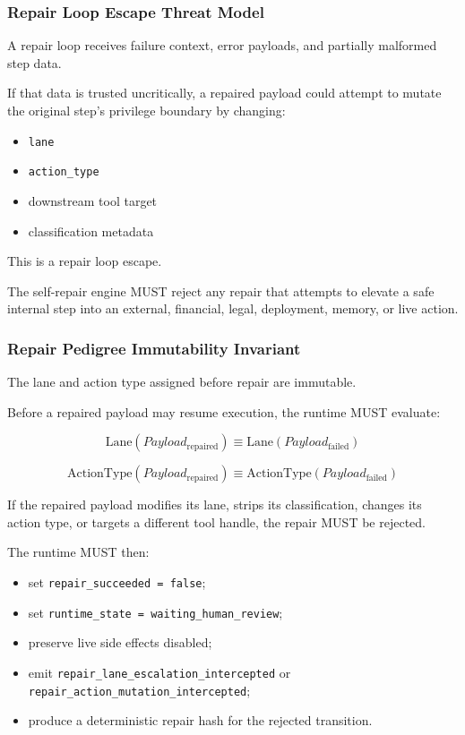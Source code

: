 \subsubsection{Repair Loop Escape Threat Model}

A repair loop receives failure context, error payloads, and partially malformed step data.

If that data is trusted uncritically, a repaired payload could attempt to mutate the original step's privilege boundary by changing:

\begin{itemize}
  \item \texttt{lane}
  \item \texttt{action\_type}
  \item downstream tool target
  \item classification metadata
\end{itemize}

This is a repair loop escape.

The self-repair engine MUST reject any repair that attempts to elevate a safe internal step into an external, financial, legal, deployment, memory, or live action.

\subsubsection{Repair Pedigree Immutability Invariant}

The lane and action type assigned before repair are immutable.

Before a repaired payload may resume execution, the runtime MUST evaluate:

\begin{equation}
\mathrm{Lane}(Payload_{\mathrm{repaired}})
\equiv
\mathrm{Lane}(Payload_{\mathrm{failed}})
\end{equation}

\begin{equation}
\mathrm{ActionType}(Payload_{\mathrm{repaired}})
\equiv
\mathrm{ActionType}(Payload_{\mathrm{failed}})
\end{equation}

If the repaired payload modifies its lane, strips its classification, changes its action type, or targets a different tool handle, the repair MUST be rejected.

The runtime MUST then:

\begin{itemize}
  \item set \texttt{repair\_succeeded = false};
  \item set \texttt{runtime\_state = waiting\_human\_review};
  \item preserve live side effects disabled;
  \item emit \texttt{repair\_lane\_escalation\_intercepted} or \texttt{repair\_action\_mutation\_intercepted};
  \item produce a deterministic repair hash for the rejected transition.
\end{itemize}

